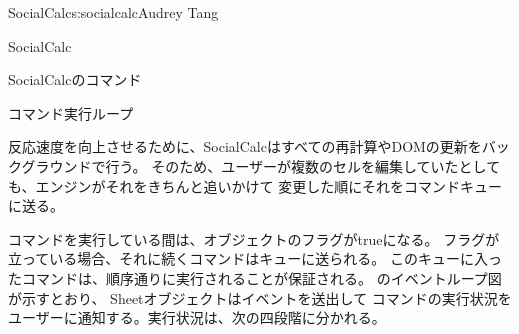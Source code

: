 \begin{aosachapter}{SocialCalc}{s:socialcalc}{Audrey Tang}
\begin{aosasect1}{SocialCalc}
\begin{table}[ht]
\begin{minipage}[b]{0.6\linewidth}
\end{minipage}
\caption{SocialCalcのコマンド}
\label{tbl.soc.commands}
\end{table}

\end{aosasect1}

\begin{aosasect1}{コマンド実行ループ}

反応速度を向上させるために、SocialCalcはすべての再計算やDOMの更新をバックグラウンドで行う。
そのため、ユーザーが複数のセルを編集していたとしても、エンジンがそれをきちんと追いかけて
変更した順にそれをコマンドキューに送る。


コマンドを実行している間は、オブジェクトのフラグがtrueになる。
フラグが立っている場合、それに続くコマンドはキューに送られる。
このキューに入ったコマンドは、順序通りに実行されることが保証される。
のイベントループ図が示すとおり、
Sheetオブジェクトはイベントを送出して
コマンドの実行状況をユーザーに通知する。実行状況は、次の四段階に分かれる。

\begin{aosadescription}


\end{aosadescription}
\end{aosasect1}
\end{aosachapter}
